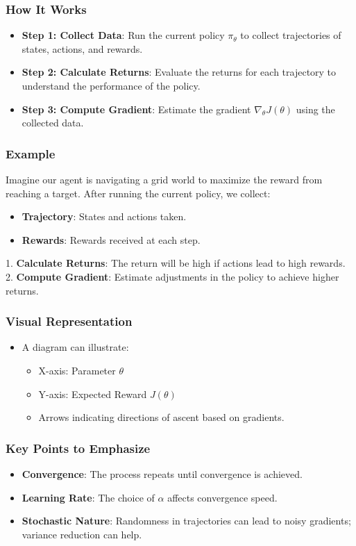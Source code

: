 \documentclass[aspectratio=169]{beamer}
\begin{document}
\begin{frame}[fragile]
    \frametitle{How It Works}
    \begin{itemize}
        \item \textbf{Step 1: Collect Data}: Run the current policy \(\pi_\theta\) to collect trajectories of states, actions, and rewards.
        \item \textbf{Step 2: Calculate Returns}: Evaluate the returns for each trajectory to understand the performance of the policy.
        \item \textbf{Step 3: Compute Gradient}: Estimate the gradient \(\nabla_\theta J(\theta)\) using the collected data.
    \end{itemize}
\end{frame}

\begin{frame}[fragile]
    \frametitle{Example}
    Imagine our agent is navigating a grid world to maximize the reward from reaching a target. After running the current policy, we collect:
    \begin{itemize}
        \item \textbf{Trajectory}: States and actions taken.
        \item \textbf{Rewards}: Rewards received at each step.
    \end{itemize}
    
    1. \textbf{Calculate Returns}: The return will be high if actions lead to high rewards.
    2. \textbf{Compute Gradient}: Estimate adjustments in the policy to achieve higher returns.
\end{frame}

\begin{frame}[fragile]
    \frametitle{Visual Representation}
    \begin{itemize}
        \item A diagram can illustrate:
        \begin{itemize}
            \item X-axis: Parameter \(\theta\)
            \item Y-axis: Expected Reward \(J(\theta)\)
            \item Arrows indicating directions of ascent based on gradients.
        \end{itemize}
    \end{itemize}
\end{frame}

\begin{frame}[fragile]
    \frametitle{Key Points to Emphasize}
    \begin{itemize}
        \item \textbf{Convergence}: The process repeats until convergence is achieved.
        \item \textbf{Learning Rate}: The choice of \(\alpha\) affects convergence speed.
        \item \textbf{Stochastic Nature}: Randomness in trajectories can lead to noisy gradients; variance reduction can help.
    \end{itemize}
\end{frame}
\end{document}
